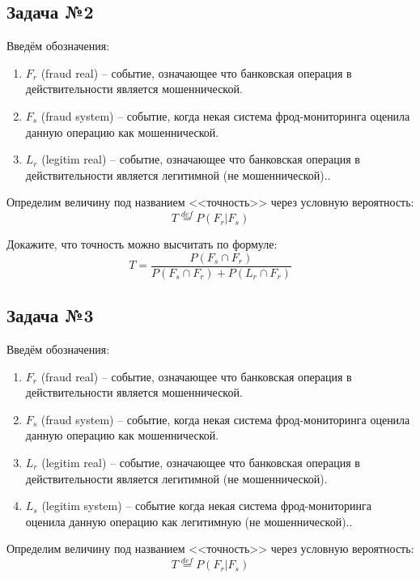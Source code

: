\documentclass[english,russian,12pt]{article}
\begin{document}
\subsection*{Задача №2}
Введём обозначения:
\begin{enumerate}
	\item $F_r$ (fraud real) -- событие, означающее что банковская операция в действительности является мошеннической. 
	\item $F_s$ (fraud system) -- событие, когда некая система фрод-мониторинга оценила данную операцию как мошеннической.
	\item $L_r$ (legitim real) -- событие, означающее что банковская операция в действительности является легитимной (не мошеннической).. 
\end{enumerate}

Определим величину под названием <<точность>> через условную вероятность:
\begin{equation}
T \stackrel{def}{=} P(F_r | F_s)
\end{equation}

Докажите, что точность можно высчитать по формуле:
\begin{equation}
T = \frac{P(F_s \cap F_r)}{P(F_s \cap F_r) + P(L_r \cap F_r)}
\end{equation}


\subsection*{Задача №3}
Введём обозначения:
\begin{enumerate}
	\item $F_r$ (fraud real) -- событие, означающее что банковская операция в действительности является мошеннической. 
	\item $F_s$ (fraud system) -- событие, когда некая система фрод-мониторинга оценила данную операцию как мошеннической.
	\item $L_r$ (legitim real) -- событие, означающее что банковская операция в действительности является легитимной (не мошеннической).
 	\item $L_s$ (legitim system) -- событие когда некая система фрод-мониторинга оценила данную операцию как легитимную (не мошеннической).. 
\end{enumerate}

Определим величину под названием <<точность>> через условную вероятность:
\begin{equation}
T \stackrel{def}{=} P(F_r | F_s)
\end{equation}
\end{document}
